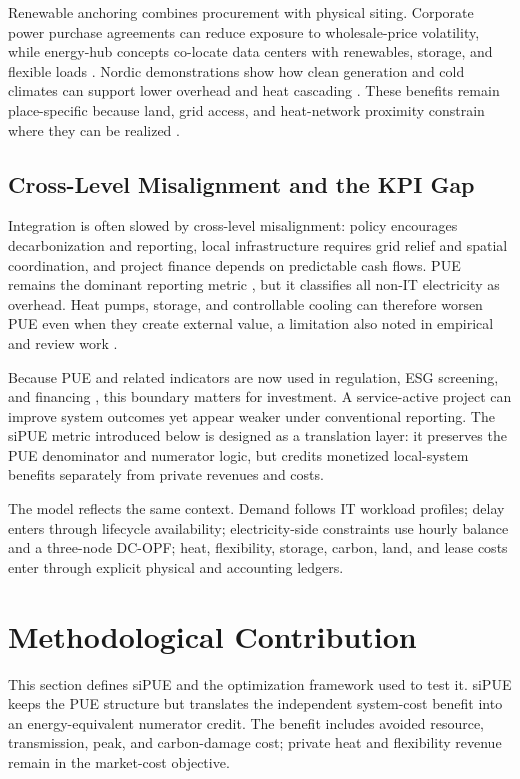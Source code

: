 \documentclass[preprint,12pt]{elsarticle}
\begin{document}
Renewable anchoring combines procurement with physical siting. Corporate power purchase agreements can reduce exposure to wholesale-price volatility, while energy-hub concepts co-locate data centers with renewables, storage, and flexible loads \cite{25}. Nordic demonstrations show how clean generation and cold climates can support lower overhead and heat cascading \cite{24}. These benefits remain place-specific because land, grid access, and heat-network proximity constrain where they can be realized \cite{9}.

\subsection{Cross-Level Misalignment and the KPI Gap}
\label{sec:cross-level-misalignment}

Integration is often slowed by cross-level misalignment: policy encourages decarbonization and reporting, local infrastructure requires grid relief and spatial coordination, and project finance depends on predictable cash flows. PUE remains the dominant reporting metric \cite{ISO30134,Belady2008PUE}, but it classifies all non-IT electricity as overhead. Heat pumps, storage, and controllable cooling can therefore worsen PUE even when they create external value, a limitation also noted in empirical and review work \cite{VandeVoort2017,Reddy2017}.

Because PUE and related indicators are now used in regulation, ESG screening, and financing \cite{15,EUDataCenterDirective2023}, this boundary matters for investment. A service-active project can improve system outcomes yet appear weaker under conventional reporting. The siPUE metric introduced below is designed as a translation layer: it preserves the PUE denominator and numerator logic, but credits monetized local-system benefits separately from private revenues and costs.

The model reflects the same context. Demand follows IT workload profiles; delay enters through lifecycle availability; electricity-side constraints use hourly balance and a three-node DC-OPF; heat, flexibility, storage, carbon, land, and lease costs enter through explicit physical and accounting ledgers.

\section{Methodological Contribution}
\label{sec:methodology}

This section defines siPUE and the optimization framework used to test it. siPUE keeps the PUE structure but translates the independent system-cost benefit into an energy-equivalent numerator credit. The benefit includes avoided resource, transmission, peak, and carbon-damage cost; private heat and flexibility revenue remain in the market-cost objective.
\end{document}
